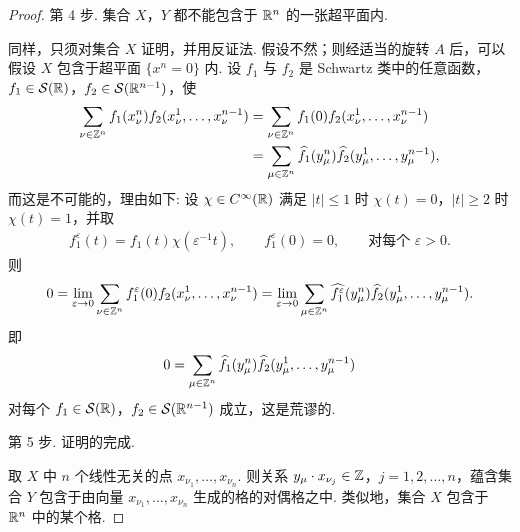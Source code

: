\begin{proof}
第 4 步. 集合 $X$，$Y$ 都不能包含于 $\mathbb{R}^n$ 的一张超平面内.

同样，只须对集合 $X$ 证明，并用反证法. 假设不然；则经适当的旋转 $A$ 后，可以假设 $X$ 包含于超平面 $\{x^n = 0\}$ 内. 设 $f_1$ 与 $f_2$ 是 Schwartz 类中的任意函数，$f_1 \in \mathcal{S}(\mathbb{R})$，$f_2 \in \mathcal{S}(\mathbb{R}^{n-1})$，使
\begin{align*}
  \sum_{\nu\in\mathbb{Z}^{n}}f_{1}(x_{\nu}^{n})f_{2}(x_{\nu}^{1},\ldots,x_{\nu}^{n-1})
  &=\sum_{\nu\in\mathbb{Z}^{n}}f_{1}(0)f_{2}(x_{\nu}^{1},\ldots,x_{\nu}^{n-1})\\
  &=\sum_{\mu\in\mathbb{Z}^{n}}\widehat{f_{1}}(y_{\mu}^{n})\widehat{f_{2}}(y_{\mu}^{1},\ldots,y_{\mu}^{n-1}),
\end{align*}
而这是不可能的，理由如下: 设 $\chi \in C^\infty(\mathbb{R})$ 满足 $|t| \leq 1$ 时 $\chi(t) = 0$，$|t| \geq 2$ 时 $\chi(t) = 1$，并取
\begin{align*}
  f_{1}^{\varepsilon}(t)=f_{1}(t)\chi(\varepsilon^{-1}t),\qquad
  f_{1}^{\varepsilon}(0)=0,\qquad \text{对每个 } \varepsilon>0.
\end{align*}
则
\begin{align*}
  0=\lim_{\varepsilon\rightarrow 0}\sum_{\nu\in\mathbb{Z}^{n}}f_{1}^{\varepsilon}(0)f_{2}(x_{\nu}^{1},\ldots,x_{\nu}^{n-1})
  =\lim_{\varepsilon\rightarrow 0}\sum_{\mu\in\mathbb{Z}^{n}}\widehat{f_{1}^{\varepsilon}}(y_{\mu}^{n})\widehat{f_{2}}(y_{\mu}^{1},\ldots,y_{\mu}^{n-1}).
\end{align*}
即
\begin{align*}
  0=\sum_{\mu\in\mathbb{Z}^{n}}\widehat{f_{1}}(y_{\mu}^{n})\widehat{f_{2}}(y_{\mu}^{1},\ldots,y_{\mu}^{n-1})
\end{align*}
对每个 $f_1 \in \mathcal{S}(\mathbb{R})$，$f_2 \in \mathcal{S}(\mathbb{R}^{n-1})$ 成立，这是荒谬的.

第 5 步. 证明的完成.

取 $X$ 中 $n$ 个线性无关的点 $x_{\nu_1}, \ldots, x_{\nu_n}$. 则关系 $y_\mu \cdot x_{\nu_j} \in \mathbb{Z}$，$j = 1, 2, \ldots, n$，蕴含集合 $Y$ 包含于由向量 $x_{\nu_1}, \ldots, x_{\nu_n}$ 生成的格的对偶格之中. 类似地，集合 $X$ 包含于 $\mathbb{R}^n$ 中的某个格.


\end{proof}
